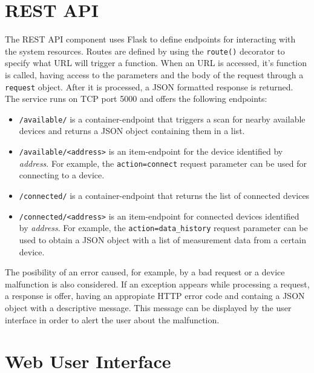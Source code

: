 \section{REST API}

The REST API component uses Flask to define endpoints for interacting with the system resources. Routes are defined by using the \texttt{route()} decorator to specify what URL will trigger a function. When an URL is accessed, it's function is called, having access to the parameters and the body of the request through a \texttt{request} object. After it is processed, a JSON formatted response is returned. The service runs on TCP port 5000 and offers the following endpoints:
\begin{itemize}
  \item \texttt{/available/} is a container-endpoint that triggers a scan for nearby available devices and returns a JSON object containing them in a list.
  \item \texttt{/available/<address>} is an item-endpoint for the device identified by \textit{address}. For example, the \texttt{action=connect} request parameter can be used for connecting to a device.
  \item \texttt{/connected/} is a container-endpoint that returns the list of connected devices
  \item \texttt{/connected/<address>} is an item-endpoint for connected devices identified by \textit{address}. For example, the \texttt{action=data_history} request parameter can be used to obtain a JSON object with a list of measurement data from a certain device.

\end{itemize}

The posibility of an error caused, for example, by a bad request or a device malfunction is also considered. If an exception appears while processing a request, a response is offer, having an appropiate HTTP error code and containg a JSON object with a descriptive message. This message can be displayed by the user interface in order to alert the user about the malfunction.

\section{Web User Interface}
\label{sec:ui-impl}


